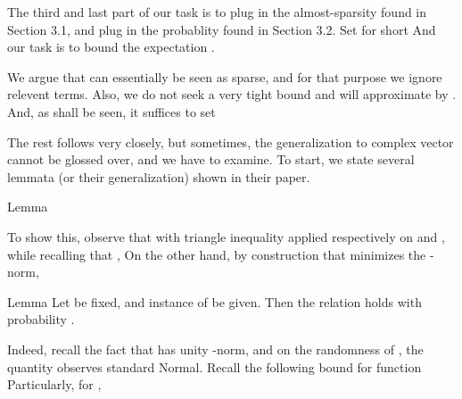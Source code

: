 \startsection [title={Generalizing the Dantzig Selector Bound}]
\startsubsection [title={Technical Lemmata in Complex Case}]

The third and last part of our task is to plug in the almost-sparsity found in Section 3.1, and plug in the probablity found in Section 3.2.
Set for short
And our task is to bound the expectation .

We argue that  can essentially be seen as sparse, and for that purpose we ignore relevent terms.
Also, we do not seek a very tight bound and will approximate  by .
And, as shall be seen, it suffices to set

The rest follows  very closely, but sometimes, the generalization to complex vector cannot be glossed over, and we have to examine.
To start, we state several lemmata (or their generalization) shown in their paper.

\Result
{Lemma}
{
}

To show this, observe that with triangle inequality applied respectively on  and , while recalling that ,
On the other hand, by construction that  minimizes the -norm,

\Result
{Lemma}
{
Let  be fixed, and instance of  be given.
Then the relation
holds with probability .
}

Indeed, recall the fact that  has unity -norm, and on the randomness of , the quantity  observes standard Normal.
Recall the following bound for  function
Particularly, for ,

